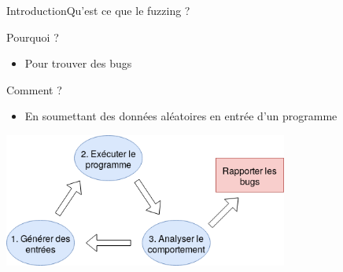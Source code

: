 \begin{frame}{Introduction}{Qu'est ce que le fuzzing ?}
  \begin{exampleblock}{Pourquoi ?}
    \begin{itemize}
      \item{Pour trouver des bugs}
    \end{itemize}
  \end{exampleblock}
  \begin{block}{Comment ?}
    \begin{itemize}
      \item{En soumettant des données aléatoires en entrée d'un programme}
    \end{itemize}
  \end{block}
  \begin{center}
    \includegraphics[width=0.7\textwidth]{../medias/fuzzing.png}
  \end{center}
\end{frame}
